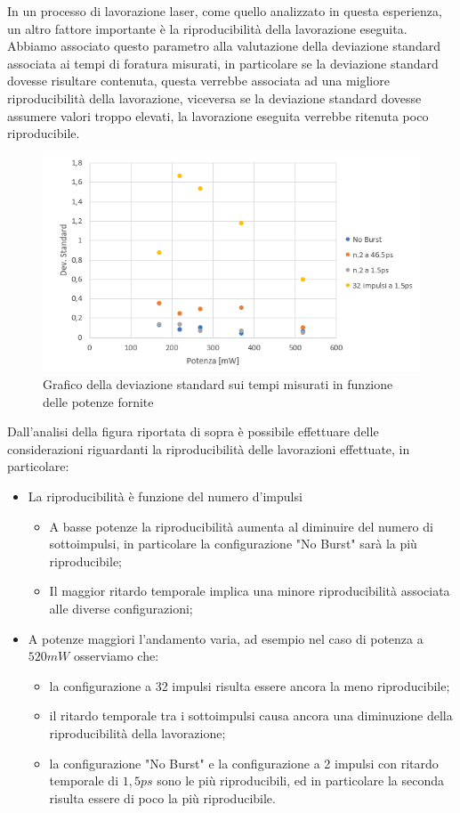 \documentclass{article}
\begin{document}
In un processo di lavorazione laser, come quello analizzato in questa esperienza, un altro fattore importante è la riproducibilità della lavorazione eseguita. Abbiamo associato questo parametro alla valutazione della deviazione standard associata ai tempi di foratura misurati, in particolare se la deviazione standard dovesse risultare contenuta, questa verrebbe associata ad una migliore riproducibilità della lavorazione, viceversa se la deviazione standard dovesse assumere valori troppo elevati, la lavorazione eseguita verrebbe ritenuta poco riproducibile.
\begin{figure}[h!]
    \centering
    \includegraphics[width=\linewidth]{grafico-devstandard.foratura.png}
    \caption{Grafico della deviazione standard sui tempi misurati in funzione delle potenze fornite}
    \label{fig:dev_standard}
\end{figure}
Dall'analisi della figura riportata di sopra è possibile effettuare delle considerazioni riguardanti la riproducibilità delle lavorazioni effettuate, in particolare:
\begin{itemize}
    \item La riproducibilità è funzione del numero d'impulsi
    \begin{itemize}
        \item A basse potenze la riproducibilità aumenta al diminuire del numero di sottoimpulsi, in particolare la configurazione "No Burst" sarà la più riproducibile;
        \item Il maggior ritardo temporale implica una minore riproducibilità associata alle diverse configurazioni;
    \end{itemize}
    \item A potenze maggiori l'andamento varia, ad esempio nel caso di potenza a $520 mW$ osserviamo che:
    \begin{itemize}
        \item la configurazione a 32 impulsi risulta essere ancora la meno riproducibile;
        \item il ritardo temporale tra i sottoimpulsi causa ancora una diminuzione della riproducibilità della lavorazione;
        \item la configurazione "No Burst" e la configurazione a 2 impulsi con ritardo temporale di $1,5 ps$ sono le più riproducibili, ed in particolare la seconda risulta essere di poco la più riproducibile.
    \end{itemize}
\end{itemize}
\end{document}
